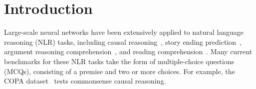 \section{Introduction}
\label{sec:intro}


Large-scale neural networks have been extensively 
applied to natural language reasoning (NLR) tasks, including causal reasoning~\cite{roemmele2011choice}, 
story ending prediction~\cite{roc2017}, argument reasoning comprehension~\cite{arct2018}, 
and reading comprehension~\cite{yu2020reclor}.
Many current benchmarks for these NLR tasks take the form of 
multiple-choice questions (MCQs), 
consisting of a premise and two or more choices. 
For example, the COPA dataset~\cite{roemmele2011choice} tests commonsense causal reasoning.

